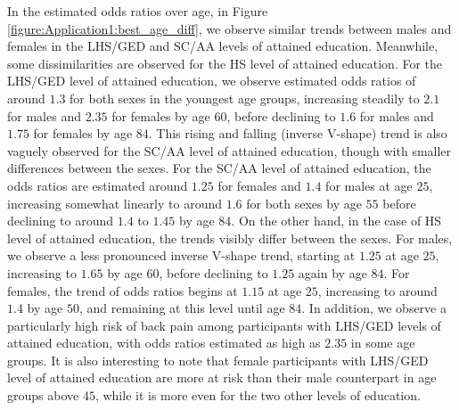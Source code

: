 \vspace{-0.2cm}
In the estimated odds ratios over age, in Figure \ref{figure:Application1:best_age_diff}, we observe similar trends between males and females in the LHS/GED and SC/AA levels of attained education. Meanwhile, some dissimilarities are observed for the HS level of attained education. For the LHS/GED level of attained education, we observe estimated odds ratios of around $1.3$ for both sexes in the youngest age groups, increasing steadily to $2.1$ for males and $2.35$ for females by age $60$, before declining to $1.6$ for males and $1.75$ for females by age $84$. This rising and falling (inverse V-shape) trend is also vaguely observed for the SC/AA level of attained education, though with smaller differences between the sexes. For the SC/AA level of attained education, the odds ratios are estimated around $1.25$ for females and $1.4$ for males at age $25$, increasing somewhat linearly to around $1.6$ for both sexes by age $55$ before declining to around $1.4$ to $1.45$ by age $84$. On the other hand, in the case of HS level of attained education, the trends visibly differ between the sexes. For males, we observe a less pronounced inverse V-shape trend, starting at $1.25$ at age $25$, increasing to $1.65$ by age $60$, before declining to $1.25$ again by age $84$. For females, the trend of odds ratios begins at $1.15$ at age $25$, increasing to around $1.4$ by age $50$, and remaining at this level until age $84$. In addition, we observe a particularly high risk of back pain among participants with LHS/GED levels of attained education, with odds ratios estimated as high as $2.35$ in some age groups. It is also interesting to note that female participants with LHS/GED level of attained education are more at risk than their male counterpart in age groups above $45$, while it is more even for the two other levels of education. 

